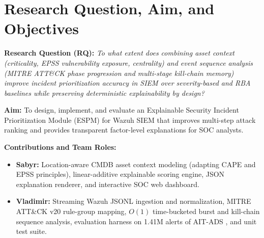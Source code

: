 \section{Research Question, Aim, and Objectives}
\textbf{Research Question (RQ):} \textit{To what extent does combining asset context (criticality, EPSS vulnerability exposure, centrality) and event sequence analysis (MITRE ATT\&CK phase progression and multi-stage kill-chain memory) improve incident prioritization accuracy in SIEM over severity-based and RBA baselines while preserving deterministic explainability by design?}

\textbf{Aim:} To design, implement, and evaluate an Explainable Security Incident Prioritization Module (ESPM) for Wazuh SIEM that improves multi-step attack ranking and provides transparent factor-level explanations for SOC analysts.

\textbf{Contributions and Team Roles:}
\begin{itemize}
    \item \textbf{Sabyr:} Location-aware CMDB asset context modeling (adapting CAPE \cite{Podder2026} and EPSS \cite{Jacobs2023} principles), linear-additive explainable scoring engine, JSON explanation renderer, and interactive SOC web dashboard.
    \item \textbf{Vladimir:} Streaming Wazuh JSONL ingestion and normalization, MITRE ATT\&CK v20 rule-group mapping, $O(1)$ time-bucketed burst and kill-chain sequence analysis, evaluation harness on 1.41M alerts of AIT-ADS \cite{Landauer2023}, and unit test suite.
\end{itemize}
